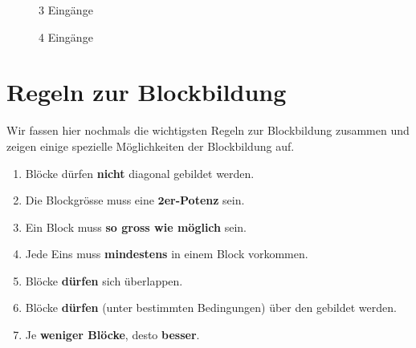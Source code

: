 \begin{figure}[htb]
\begin{minipage}{0.45\textwidth}
\centering
{}
\caption{\num{3} Eingänge}
\label{figure-kv-diagramm-e-3}
\end{minipage}
\hfill
\begin{minipage}{0.45\textwidth}
\centering
{}
\caption{\num{4} Eingänge}
\label{figure-kv-diagramm-e-4}
\end{minipage}
\end{figure}

\newpage

\section{Regeln zur Blockbildung}

Wir fassen hier nochmals die wichtigsten Regeln zur Blockbildung zusammen und zeigen einige spezielle Möglichkeiten der Blockbildung auf.

\begin{enumerate}
\item Blöcke dürfen \textbf{nicht} diagonal gebildet werden.
\item Die Blockgrösse muss eine \textbf{$\mathbf{2}$er-Potenz} sein.
\item Ein Block muss \textbf{so gross wie möglich} sein.
\item Jede Eins muss \textbf{mindestens} in einem Block vorkommen.
\item Blöcke \textbf{dürfen} sich überlappen.
\item Blöcke \textbf{dürfen} (unter bestimmten Bedingungen) über den  gebildet werden.
\item Je \textbf{weniger Blöcke}, desto \textbf{besser}.
\end{enumerate}

